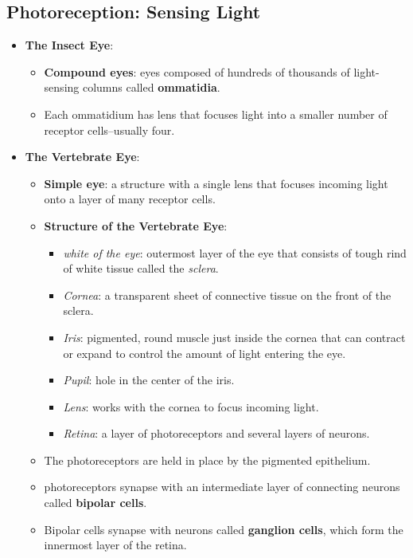 \documentclass[12pt,a4paper]{article}
\begin{document}
\subsection{Photoreception: Sensing Light}
\begin{itemize}
    \item \textbf{The Insect Eye}:
        \begin{itemize}
            \item \textbf{Compound eyes}: eyes composed of hundreds of thousands of light-sensing columns called \textbf{ommatidia}.
            \item Each ommatidium has lens that focuses light into a smaller number of receptor cells--usually four.
        \end{itemize}
    \item \textbf{The Vertebrate Eye}:
        \begin{itemize}
            \item \textbf{Simple eye}: a structure with a single lens that focuses incoming light onto a layer of many receptor cells.
            \item \textbf{Structure of the Vertebrate Eye}:
                \begin{itemize}
                    \item \textit{white of the eye}: outermost layer of the eye that consists of tough rind of white tissue called the \textit{sclera}.
                    \item \textit{Cornea}: a transparent sheet of connective tissue on the front of the sclera.
                    \item \textit{Iris}: pigmented, round muscle just inside the cornea that can contract or expand to control the amount of light entering the eye.
                    \item \textit{Pupil}: hole in the center of the iris.
                    \item \textit{Lens}: works with the cornea to focus incoming light.
                    \item \textit{Retina}: a layer of photoreceptors and several layers of neurons.
                \end{itemize}
            \item The photoreceptors are held in place by the pigmented epithelium.
            \item photoreceptors synapse with an intermediate layer of connecting neurons called \textbf{bipolar cells}.
            \item Bipolar cells synapse with neurons called \textbf{ganglion cells}, which form the innermost layer of the retina.

\end{itemize}
\end{itemize}
\end{document}
